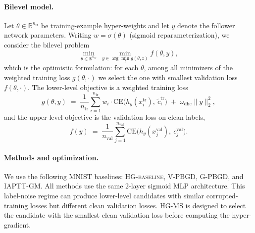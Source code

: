 \documentclass{article}
\theoremstyle{normaltheorem}
\newcommand{\R}{\mathbb{R}}
\begin{document}
\paragraph{Bilevel model.}
Let $\theta\in\R^{n_{\mathrm{tr}}}$ be training-example hyper-weights and let $y$ denote the follower network parameters.
Writing $w=\sigma(\theta)$ (sigmoid reparameterization), we consider the bilevel problem
\[
\min_{\theta\in\R^{n_{\mathrm{tr}}}}\ \min_{y\in\arg\min_{z} g(\theta,z)} f(\theta,y),
\]
which is the optimistic formulation: for each $\theta$, among all minimizers of the weighted training loss $g(\theta,\cdot)$ we select
the one with smallest validation loss $f(\theta,\cdot)$.
The lower-level objective is a weighted training loss
\[
g(\theta,y)\;=\;\frac{1}{n_{\mathrm{tr}}}\sum_{i=1}^{n_{\mathrm{tr}}} w_i\cdot \mathrm{CE}\big(h_y(x_i^{\mathrm{tr}}),\ \widetilde c_i^{\mathrm{tr}}\big)\;+\;\omega_{\mathrm{dhc}}\|y\|_2^2,
\]
and the upper-level objective is the validation loss on clean labels,
\[
f(y)\;=\;\frac{1}{n_{\mathrm{val}}}\sum_{j=1}^{n_{\mathrm{val}}}\mathrm{CE}\big(h_y(x_j^{\mathrm{val}}),\ c_j^{\mathrm{val}}\big).
\]

\paragraph{Methods and optimization.}
We use the following MNIST baselines: \textsc{HG-baseline}, V-PBGD, G-PBGD, and IAPTT-GM.
All methods use the same 2-layer sigmoid MLP architecture.
This label-noise regime can produce lower-level candidates with similar corrupted-training losses but different clean
validation losses. \textsc{HG-MS} is designed to select the candidate with the smallest clean validation loss before
computing the hyper-gradient.
\end{document}
